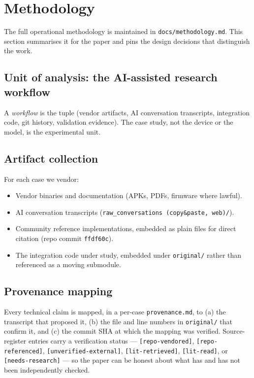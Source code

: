 \documentclass[11pt,a4paper]{article}
\begin{document}
\section{Methodology}
\label{sec:methodology}

The full operational methodology is maintained in
\texttt{docs/methodology.md}. This section summarises it for the paper and
pins the design decisions that distinguish the work.

\subsection{Unit of analysis: the AI-assisted research workflow}
\label{sec:unit-of-analysis}
A \emph{workflow} is the tuple (vendor artifacts, AI conversation
transcripts, integration code, git history, validation evidence). The case
study, not the device or the model, is the experimental unit.

\subsection{Artifact collection}
\label{sec:artifact-collection}
For each case we vendor:
\begin{itemize}
  \item Vendor binaries and documentation (APKs, PDFs, firmware where
        lawful).
  \item AI conversation transcripts
        (\texttt{raw\_conversations (copy\&paste, web)/}).
  \item Community reference implementations, embedded as plain files for
        direct citation (repo commit \texttt{ffdf60c}).
  \item The integration code under study, embedded under
        \texttt{original/} rather than referenced as a moving submodule.
\end{itemize}

\subsection{Provenance mapping}
\label{sec:provenance-mapping}
Every technical claim is mapped, in a per-case
\texttt{provenance.md}, to (a) the transcript that proposed it, (b) the file
and line numbers in \texttt{original/} that confirm it, and (c) the commit
SHA at which the mapping was verified. Source-register entries carry a
verification status --- \texttt{[repo-vendored]},
\texttt{[repo-referenced]}, \texttt{[unverified-external]},
\texttt{[lit-retrieved]}, \texttt{[lit-read]}, or \texttt{[needs-research]}
--- so the paper can be honest about what has and has not been independently
checked.
\end{document}

